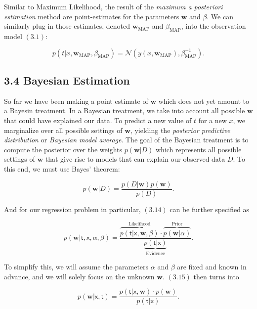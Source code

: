 \documentclass[
  0.875em,
  letterpaper,
  DIV=11,
  numbers=noendperiod]{scrartcl}
\begin{document}
Similar to Maximum Likelihood, the result of the \emph{maximum a
posteriori estimation} method are point-estimates for the parameters
\(\mathbf{w}\) and \(\beta\). We can similarly plug in those estimates,
denoted \(\mathbf{w}_{\text{MAP}}\) and \(\beta_{\text{MAP}}\), into the
observation model \((3.1)\):

\[
p(t|x, \mathbf{w}_{\text{MAP}}, \beta_{\text{MAP}}) = \mathcal{N}(y(x, \mathbf{w}_{\text{MAP}}), \beta^{-1}_{\text{MAP}}). \tag{3.13}
\]

\hypertarget{bayesian-estimation}{%
\subsection{3.4 Bayesian Estimation}\label{bayesian-estimation}}

So far we have been making a point estimate of \(\mathbf{w}\) which does
not yet amount to a Bayesin treatment. In a Bayesian treatment, we take
into account all possible \(\mathbf{w}\) that could have explained our
data. To predict a new value of \(t\) for a new \(x\), we marginalize
over all possible settings of \(\mathbf{w}\), yielding the
\emph{posterior predictive distribution} or \emph{Bayesian model
average}. The goal of the Bayesian treatment is to compute the posterior
over the weights \(p(\mathbf{w}|D)\) which represents all possible
settings of \(\mathbf{w}\) that give rise to models that can explain our
observed data \(D\). To this end, we must use Bayes' theorem:

\[
p(\mathbf{w}|D) = \frac{p(D|\mathbf{w})p(\mathbf{w})}{p(D)}. \tag{3.14}
\]

And for our regression problem in particular, \((3.14)\) can be further
specified as

\[
p(\mathbf{w}|\pmb{\mathsf{t}}, \pmb{\mathsf{x}}, \alpha, \beta) = \frac{\overbrace{p(\pmb{\mathsf{t}} | \pmb{\mathsf{x}}, \mathbf{w}, \beta)}^{\text{Likelihood}} \cdot \overbrace{p(\mathbf{w} | \alpha)}^{\text{Prior}}}{\underbrace{p(\pmb{\mathsf{t}} | \pmb{\mathsf{x}})}_{\text{Evidence}}}.
\tag{3.15} 
\]

To simplify this, we will assume the parameters \(\alpha\) and \(\beta\)
are fixed and known in advance, and we will solely focus on the unknown
\(\mathbf{w}\). \((3.15)\) then turns into

\[
p(\mathbf{w} \vert \pmb{\mathsf{x}}, \pmb{\mathsf{t}}) = \frac{p(\pmb{\mathsf{t}} \vert \pmb{\mathsf{x}}, \mathbf{w}) \cdot p(\mathbf{w})}{p(\pmb{\mathsf{t}} \vert \pmb{\mathsf{x}})}. \tag{3.16}
\]
\end{document}
